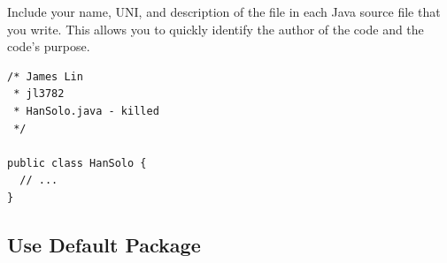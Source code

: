 \documentclass[11pt,DIV=23,landscape]{scrartcl}
\begin{document}
\begin{paracol}{2}
\begin{leftcolumn}
Include your name, UNI, and description of the file in each Java source
file that you write. This allows you to quickly identify the author of
the code and the code's purpose.
\end{leftcolumn}

\begin{rightcolumn}
\begin{lstlisting}
/* James Lin
 * jl3782
 * HanSolo.java - killed
 */

public class HanSolo {
  // ...
}
\end{lstlisting}
\end{rightcolumn}
\end{paracol}

\newpage
\subsection{Use Default Package}\label{use-default-package}
\end{document}

